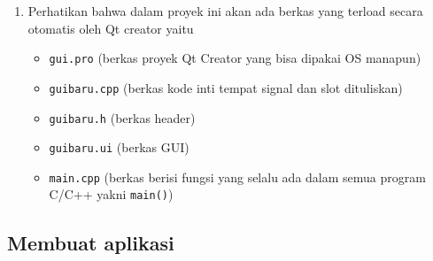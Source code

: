 \begin{enumerate}
		\item Perhatikan bahwa dalam proyek ini akan ada berkas yang terload secara otomatis oleh Qt creator yaitu
		
		\begin{itemize}
			\item \texttt{gui.pro} (berkas proyek Qt Creator yang bisa dipakai OS manapun)
			\item  \texttt{guibaru.cpp} (berkas kode inti tempat signal dan slot dituliskan)
			\item \texttt{guibaru.h} (berkas header)
			\item \texttt{guibaru.ui} (berkas GUI)
			\item \texttt{main.cpp} (berkas berisi fungsi yang selalu ada dalam semua program C/C++ yakni \texttt{main()})
			
		\end{itemize}
	
\end{enumerate}

\subsection{Membuat aplikasi}

